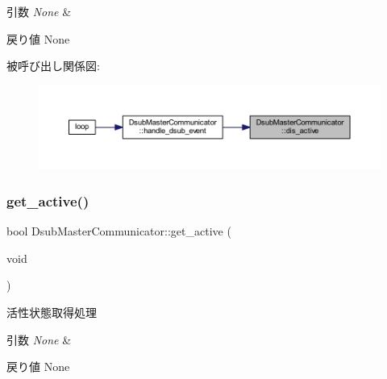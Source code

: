 \begin{DoxyParams}{引数}
{\em None} & \\
\hline
\end{DoxyParams}
\begin{DoxyReturn}{戻り値}
None 
\end{DoxyReturn}
被呼び出し関係図\+:
\nopagebreak
\begin{figure}[H]
\begin{center}
\leavevmode
\includegraphics[width=350pt]{class_dsub_master_communicator_ac0a9298c691adbdf844f85d680d7e554_icgraph}
\end{center}
\end{figure}
\mbox{\label{class_dsub_master_communicator_a81a0576ab39cc508c879336038c4fd4a}} 
\subsubsection{\texorpdfstring{get\_active()}{get\_active()}}
{\footnotesize\ttfamily bool Dsub\+Master\+Communicator\+::get\+\_\+active (\begin{DoxyParamCaption}\item[{void}]{ }\end{DoxyParamCaption})}



活性状態取得処理 


\begin{DoxyParams}{引数}
{\em None} & \\
\hline
\end{DoxyParams}
\begin{DoxyReturn}{戻り値}
None 
\end{DoxyReturn}
\mbox{\label{class_dsub_master_communicator_a91a5a356d0aa58a30f3381522cd7616f}} 
